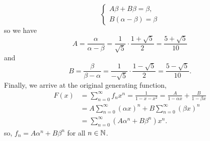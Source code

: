 \documentclass[11pt]{article}
\begin{document}
\begin{titlepage}
\begin{equation*}
\begin{cases}
	A\beta + B\beta = \beta,\\
	B(\alpha - \beta) = \beta
\end{cases}
\end{equation*}
so we have 
\begin{equation*}
	A = \frac{\alpha}{\alpha-\beta} = \frac{1}{\sqrt 5} \cdot
	\frac{1+\sqrt{5}}{2} = \frac{5+\sqrt 5}{10}
\end{equation*}
and 
\begin{equation*}
	B = \frac{\beta}{\beta - \alpha} = \frac{1}{-\sqrt 5} \cdot \frac{1-\sqrt
	5}{2} = \frac{5 - \sqrt 5}{10}.
\end{equation*}
Finally, we arrive at the original generating function,
\begin{align*}
	F(x) &= \sum^\infty_{n=0} f_nx^n = \frac{1}{1-x-x^2} = \frac{A}{1-\alpha x}
	+ \frac{B}{1-\beta x}\\
	&= A \sum^\infty_{n=0} (\alpha x)^n + B\sum^\infty_{n=0} (\beta x)^n
	\tag{by geometric series}\\
	&= \sum^\infty_{n=0} (A\alpha^n + B\beta^n)x^n.
\end{align*}
so, $f_n = A\alpha^n + B\beta^n$ for all $n\in\mathbb{N}$.


\end{titlepage}
\end{document}
